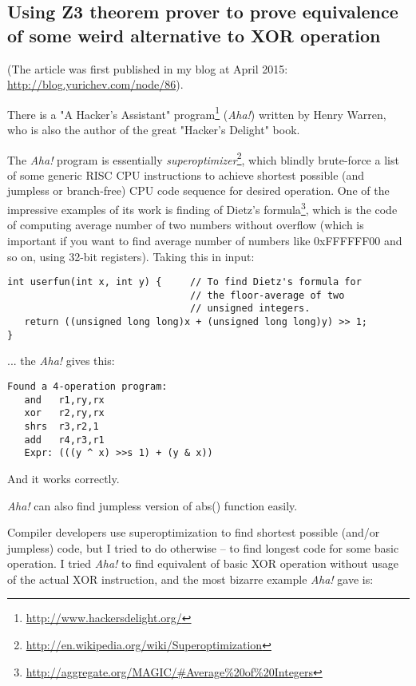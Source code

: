 \subsection{Using Z3 theorem prover to prove equivalence of some weird alternative to XOR operation}

(The article was first published in my blog at April 2015: \url{http://blog.yurichev.com/node/86}).

There is a "A Hacker's Assistant" program\footnote{\url{http://www.hackersdelight.org/}} (\textit{Aha!}) written by Henry Warren,
who is also the author of the great "Hacker's Delight" book.

The \textit{Aha!} program is essentially \textit{superoptimizer}\footnote{\url{http://en.wikipedia.org/wiki/Superoptimization}},
which blindly brute-force a list of some generic RISC CPU instructions to achieve shortest possible (and jumpless or branch-free) 
CPU code sequence for desired operation.
One of the impressive examples of its work is finding of Dietz's formula\footnote{\url{http://aggregate.org/MAGIC/\#Average\%20of\%20Integers}},
which is the code of computing average number of two numbers without overflow (which is important if you want to find average number of numbers like 0xFFFFFF00 and so on, using 32-bit registers).
Taking this in input:

\begin{lstlisting}
int userfun(int x, int y) {     // To find Dietz's formula for
                                // the floor-average of two
                                // unsigned integers.
   return ((unsigned long long)x + (unsigned long long)y) >> 1;
}
\end{lstlisting}

... the \textit{Aha!} gives this:

\begin{lstlisting}
Found a 4-operation program:
   and   r1,ry,rx
   xor   r2,ry,rx
   shrs  r3,r2,1
   add   r4,r3,r1
   Expr: (((y ^ x) >>s 1) + (y & x))
\end{lstlisting}

And it works correctly.

\textit{Aha!} can also find jumpless version of abs() function easily.

Compiler developers use superoptimization to find shortest possible (and/or jumpless) code, but I tried to do otherwise -- to find longest code for some basic operation.
I tried \textit{Aha!} to find equivalent of basic XOR operation without usage of the actual XOR instruction, and the most bizarre example \textit{Aha!} gave is:

